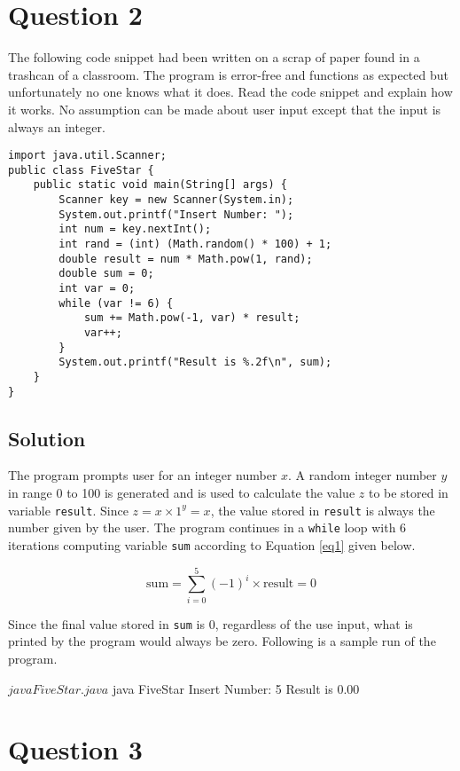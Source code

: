 \documentclass[12pt,letterpaper,twoside]{article}
\begin{document}
\section*{Question 2}
The following code snippet had been written on a scrap of paper found in a trashcan of a classroom.
The program is error-free and functions as expected but unfortunately no one knows what it does.
Read the code snippet and explain how it works.
No assumption can be made about user input except that the input is always an integer.

\begin{lstlisting}
import java.util.Scanner;
public class FiveStar {
	public static void main(String[] args) {
		Scanner key = new Scanner(System.in);
		System.out.printf("Insert Number: ");
		int num = key.nextInt();
		int rand = (int) (Math.random() * 100) + 1;
		double result = num * Math.pow(1, rand);
		double sum = 0;
		int var = 0;
		while (var != 6) {
			sum += Math.pow(-1, var) * result;
			var++;
		}
		System.out.printf("Result is %.2f\n", sum);
	}
}
\end{lstlisting}

\subsection*{Solution}

The program prompts user for an integer number $x$.
A random integer number $y$ in range 0 to 100 is generated and is used to calculate the value $z$ to be stored in variable \texttt{result}.
Since $z = x \times 1^{y} = x$, the value stored in \texttt{result} is always the number given by the user.
The program continues in a \texttt{while} loop with 6 iterations computing variable \texttt{sum} according to Equation \ref{eq1} given below.

\begin{equation}
\text{sum} = \sum\limits_{i=0}^5 (-1)^i \times \text{result} = 0
\label{eq1}
\end{equation}

Since the final value stored in \texttt{sum} is $0$, regardless of the use input, what is printed by the program would always be zero.
Following is a sample run of the program.

\begin{terminal}
$ java FiveStar.java
$ java FiveStar
Insert Number: 5
Result is 0.00
\end{terminal}

\section*{Question 3}
\end{document}
